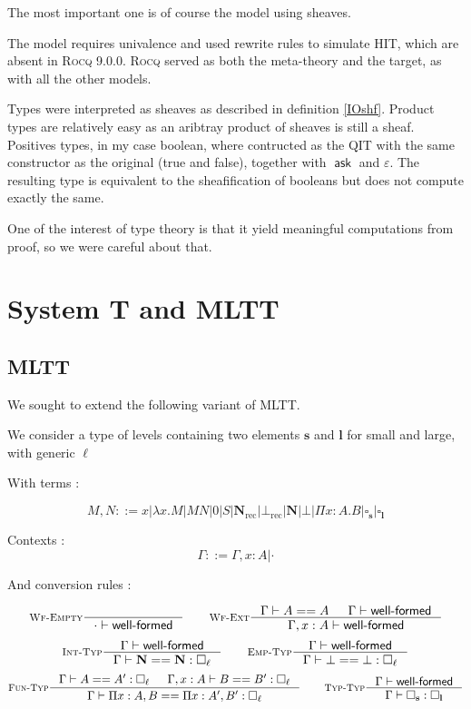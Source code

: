 \documentclass[11pt]{article}
\DeclareMathOperator{\ask}{\mathsf{ask}}
\DeclareMathOperator{\rec}{rec}
\newcommand{\0}{\mathbf{0}}
\newcommand{\1}{\mathbf{1}}
\newcommand{\nat}{\mathbf{N}}
\newcommand{\tctx}{\Gamma}
\newcommand{\Wf}{\textsf{well-formed}}
\newcommand{\slvl}{\mathbf{s}}
\newcommand{\llvl}{\mathbf{l}}
\begin{document}
The most important one is of course the model using sheaves.

The model requires univalence and used rewrite rules to simulate HIT, which are absent in \textsc{Rocq} 9.0.0. \textsc{Rocq} served as both the meta-theory and the target, as with all the other models.

Types were interpreted as sheaves as described in definition \ref{IOshf}. Product types are relatively easy as an aribtray product of sheaves is still a sheaf. Positives types, in my case boolean, where contructed as the QIT with the same constructor as the original (true and false), together with $\ask$ and $\varepsilon$. The resulting type is equivalent to the sheafification of booleans but does not compute exactly the same.

One of the interest of type theory is that it yield meaningful computations from proof, so we were careful about that.


\section{System T and MLTT}
\subsection{MLTT}
We sought to extend the following variant of MLTT.

We consider a type of levels containing two elements $\slvl$ and $\llvl$ for small and large, with generic $\ell$

With terms :

$$ M,N ::= x | \lambda x. M | MN | 0 | S | \nat_{\rec} | \bot_{\rec} | \nat | \bot | \Pi x :A.B | \square_\slvl | \square_\llvl$$


Contexts :
$$ \tctx ::= \tctx, x : A | \cdot $$

And conversion rules :

$$
    \inference[\textsc{Wf-Empty}]{}{\cdot |- \Wf} \qquad
    \inference[\textsc{Wf-Ext}]{\tctx |- A == A & \tctx |- \Wf}{ \tctx, x : A |- \Wf}
$$
$$
    \inference[\textsc{Int-Typ}]{\tctx |- \Wf}{\tctx |- \nat == \nat : \square_\ell} \qquad
    \inference[\textsc{Emp-Typ}]{\tctx |- \Wf}{\tctx |- \bot == \bot : \square_\ell}
$$
$$
    \inference[\textsc{Fun-Typ}]{\tctx |- A == A' : \square_\ell & \tctx, x : A |- B == B' : \square_\ell}{\tctx |- \Pi x  : A, B == \Pi x: A', B' : \square_\ell} \qquad
    \inference[\textsc{Typ-Typ}]{\tctx |- \Wf}{\tctx |- \square_\slvl : \square_\llvl}
$$
\end{document}
